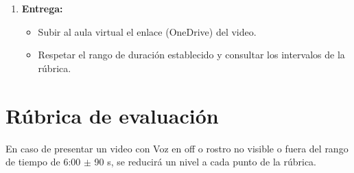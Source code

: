\documentclass[a4,11pt]{aleph-notas}
\begin{document}
\begin{enumerate}[leftmargin=*]
    \item \textbf{Entrega:}
    \begin{itemize}
        \item Subir al aula virtual el enlace (OneDrive) del video.
        \item Respetar el rango de duración establecido y consultar los intervalos de la rúbrica.
    \end{itemize}
\end{enumerate}


\section{Rúbrica de evaluación}

En caso de presentar un video con Voz en off o rostro no visible o fuera del rango de tiempo de 6:00 $\pm$ 90 s, se reducirá un nivel a cada punto de la rúbrica.
\end{document}
